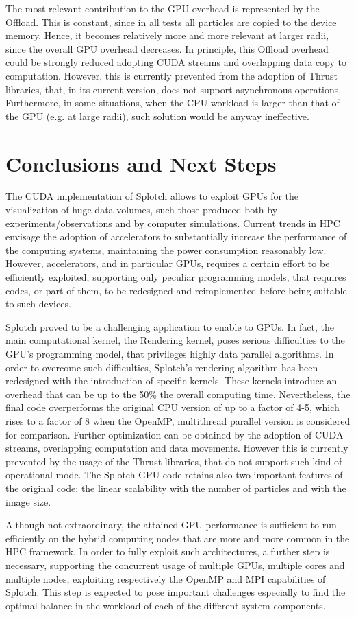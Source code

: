 \documentclass[1p]{elsarticle}
\begin{document}
The most relevant contribution to the GPU overhead is represented by the 
Offload. This is constant, since in all tests all particles are copied 
to the device memory. Hence, it becomes relatively more and more relevant at larger
radii, since the overall GPU overhead decreases. In principle, this Offload overhead could
be strongly reduced adopting CUDA streams and overlapping data copy to 
computation. However, this is currently prevented from the adoption of
Thrust libraries, that, in its current version, does not support asynchronous operations. Furthermore,
in some situations, when the CPU workload is larger than that of
the GPU (e.g. at large radii), such solution would be anyway ineffective.  

\section{Conclusions and Next Steps}
\label{sec:conclusions}
The CUDA implementation of Splotch allows to exploit GPUs 
for the visualization of huge data volumes, such those produced both 
by experiments/observations and by computer simulations. Current trends
in HPC envisage the adoption of accelerators to substantially 
increase the performance of the computing systems, maintaining the power
consumption reasonably low. However, accelerators, and in particular 
GPUs, requires a certain effort to be efficiently exploited, 
supporting only peculiar programming models, that requires codes, or part
of them, to be redesigned and reimplemented before being suitable to such devices. 

Splotch proved to be a challenging application to enable to GPUs. 
In fact, the main computational kernel, the Rendering kernel, poses serious difficulties
to the GPU's programming model, that privileges highly data parallel algorithms.
In order to overcome such difficulties, Splotch's rendering algorithm has been
redesigned with the introduction of specific kernels. These kernels 
introduce an overhead that can be up to the 50\% the overall computing
time. Nevertheless, the final code overperforms the original CPU
version of up to a factor of 4-5, which rises to a factor of 8 when the OpenMP,
multithread parallel version is considered for comparison. Further optimization can
be obtained by the adoption of CUDA streams, overlapping computation 
and data movements. However this is currently prevented by the usage of the 
Thrust libraries, that do not support such kind of operational mode. 
The Splotch GPU code retains also two important features of the original
code: the linear scalability with the number of particles and with the 
image size. 

Although not extraordinary, the attained GPU performance is sufficient 
to run efficiently on the hybrid computing nodes that are more and 
more common in the HPC framework. In order to fully exploit such architectures, 
a further step is necessary, supporting the concurrent usage of 
multiple GPUs, multiple cores and multiple nodes, exploiting respectively the OpenMP and
MPI capabilities of Splotch. This step is expected to pose important 
challenges especially to find the optimal balance in the workload of each of the different 
system components.



	
\end{document}
